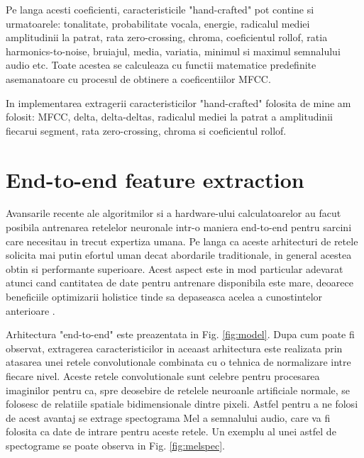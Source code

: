 \documentclass[a4paper,12pt]{book}
\begin{document}
				Pe langa acesti coeficienti, caracteristicile "hand-crafted" pot contine si urmatoarele: tonalitate, probabilitate vocala, energie,  radicalul mediei amplitudinii la patrat, rata zero-crossing, chroma, coeficientul rollof, ratia harmonics-to-noise, bruiajul, media, variatia, minimul si maximul semnalului audio etc. Toate acestea se calculeaza cu functii matematice predefinite asemanatoare cu procesul de obtinere a coeficentiilor MFCC.			
				
				In implementarea extragerii caracteristicilor "hand-crafted" folosita de mine am folosit: MFCC, delta, delta-deltas, radicalul mediei la patrat a amplitudinii fiecarui segment, rata zero-crossing, chroma si coeficientul rollof.
				
			\section{End-to-end feature extraction}	\label{end-to-end}
			
			Avansarile recente ale algoritmilor si a hardware-ului calculatoarelor au facut posibila antrenarea retelelor neuronale intr-o maniera end-to-end pentru sarcini care necesitau in trecut expertiza umana. Pe langa ca aceste arhitecturi de retele solicita mai putin efortul uman decat abordarile traditionale, in general acestea obtin si performante superioare. Acest aspect este in mod particular adevarat atunci cand cantitatea de date pentru antrenare disponibila este mare, deoarece beneficiile optimizarii holistice tinde sa depaseasca acelea a cunostintelor anterioare  \cite{graves}. \par
			
			Arhitectura "end-to-end" este preazentata in Fig. \ref{fig:model}. Dupa cum poate fi observat, extragerea caracteristicilor in aceaast arhitectura este realizata prin atasarea unei retele convolutionale  combinata cu o tehnica de normalizare intre fiecare nivel. Aceste retele convolutionale sunt celebre pentru procesarea imaginilor pentru ca, spre deosebire de retelele neuroanle artificiale normale, se folosesc de relatiile spatiale bidimensionale dintre pixeli. Astfel pentru a ne folosi de acest avantaj se extrage spectograma Mel a semnalului audio, care va fi folosita ca date de intrare pentru aceste retele. Un exemplu al unei astfel de spectograme se poate observa in Fig. \ref{fig:melspec}. \par
						
\end{document}
